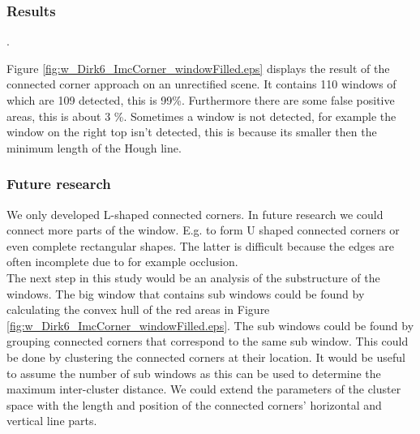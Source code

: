 \subsubsection{Results}
\label{sec:results}.


\newpage
{}
\clearpage

Figure \ref{fig:w_Dirk6_ImcCorner_windowFilled.eps} displays the result of the
connected corner approach on an unrectified scene.  It contains 110 windows of
which are 109 detected, this is 99\%. Furthermore there are some false positive
areas, this is about 3 \%.
Sometimes a window is not detected, for example the window on the right top
isn't detected, this is because its smaller then the minimum length of the
Hough line.\\


\subsubsection{Future research} %
We only developed L-shaped connected corners. In future research we could
connect more parts of the window. E.g. to form U shaped connected corners or
even complete rectangular shapes. The latter is difficult because the edges are
often incomplete due to for example occlusion.\\

The next step in this study would be an analysis of the substructure
of the windows.  The big window that contains sub windows could be
found by calculating the convex hull of the red areas in Figure
\ref{fig:w_Dirk6_ImcCorner_windowFilled.eps}.  The sub windows could be found
by grouping connected corners that correspond to the same sub window.
This could be done by clustering the connected corners at their location.
It would be useful to assume the number of sub windows as this can be used to
determine the maximum inter-cluster distance.  
We could extend the parameters of the cluster space with 
the length and position of the connected corners' horizontal and vertical line
parts.

